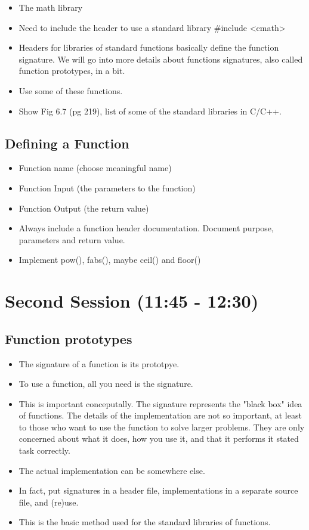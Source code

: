 \documentclass[11pt]{article}
\begin{document}
\begin{itemize}
\item The math library
\item Need to include the header to use a standard library \#include <cmath>
\item Headers for libraries of standard functions basically define the
function signature.  We will go into more details about functions
signatures, also called function prototypes, in a bit.
\item Use some of these functions.
\item Show Fig 6.7 (pg 219), list of some of the standard libraries in C/C++.
\end{itemize}
\subsection{Defining a Function}
\label{sec-1-3}
\begin{itemize}
\item Function name (choose meaningful name)
\item Function Input (the parameters to the function)
\item Function Output (the return value)
\item Always include a function header documentation.  Document purpose,
parameters and return value.
\item Implement pow(), fabs(), maybe ceil() and floor()
\end{itemize}
\section{Second Session (11:45 - 12:30)}
\label{sec-2}

\subsection{Function prototypes}
\label{sec-2-1}
\begin{itemize}
\item The signature of a function is its prototpye.
\item To use a function, all you need is the signature.
\item This is important conceputally.  The signature represents the "black
box" idea of functions.  The details of the implementation are not
so important, at least to those who want to use the function to
solve larger problems.  They are only concerned about what it does,
how you use it, and that it performs it stated task correctly.
\item The actual implementation can be somewhere else.
\item In fact, put signatures in a header file, implementations in a separate source file, and (re)use.
\item This is the basic method used for the standard libraries of functions.
\end{itemize}
\end{document}
